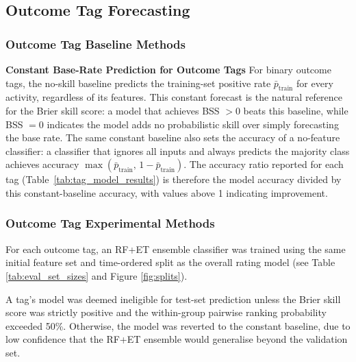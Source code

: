 \documentclass[12pt,a4paper]{article}
\begin{document}
\subsection{Outcome Tag Forecasting}
\label{sub:outcome_tag_forecasting}
\subsubsection{Outcome Tag Baseline Methods}
\textbf{Constant Base-Rate Prediction for Outcome Tags}
For binary outcome tags, the no-skill baseline predicts the training-set positive rate $\bar{p}_{\text{train}}$ for every activity, regardless of its features. This constant forecast is the natural reference for the Brier skill score: a model that achieves BSS $> 0$ beats this baseline, while BSS $= 0$ indicates the model adds no probabilistic skill over simply forecasting the base rate. The same constant baseline also sets the accuracy of a no-feature classifier: a classifier that ignores all inputs and always predicts the majority class achieves accuracy $\max(\bar{p}_{\text{train}},\, 1-\bar{p}_{\text{train}})$. The accuracy ratio reported for each tag (Table~\ref{tab:tag_model_results}) is therefore the model accuracy divided by this constant-baseline accuracy, with values above 1 indicating improvement.

\subsubsection{Outcome Tag Experimental Methods} \label{sub:experimental_methods_ot}

For each outcome tag, an RF+ET ensemble classifier was trained using the same initial feature set and time-ordered split as the overall rating model (see Table \ref{tab:eval_set_sizes} and Figure \ref{fig:splits}). 

A tag's model was deemed ineligible for test-set prediction unless the Brier skill score was strictly positive and the within-group pairwise ranking probability exceeded 50\%. Otherwise, the model was reverted to the constant baseline, due to low confidence that the RF+ET ensemble would generalise beyond the validation set.
\end{document}
